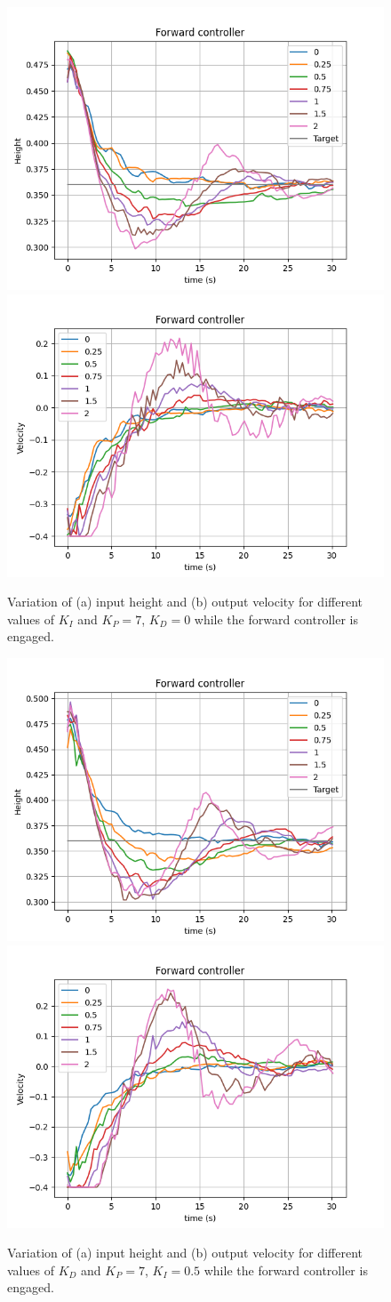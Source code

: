 \begin{figure}
  \centering
  \includegraphics[width=.45\linewidth]{img/pid/fwd/aaa_fwd_pos_p3_int_d0.png}
  \includegraphics[width=.45\linewidth]{img/pid/fwd/aaa_fwd_vel_p3_int_d0.png}
  \caption{Variation of (a) input height and (b) output velocity for different values of $K_{I}$ and $K_P=7$, $K_D=0$ while the forward controller is engaged.}\label{fig:tune-fwd-int}
\end{figure}
\begin{figure}
  \centering
  \includegraphics[width=.45\linewidth]{img/pid/fwd/aaa_fwd_pos_p3_i0_der.png}
  \includegraphics[width=.45\linewidth]{img/pid/fwd/aaa_fwd_vel_p3_i0_der.png}
  \caption{Variation of (a) input height and (b) output velocity for different values of $K_{D}$ and $K_P=7$, $K_I=0.5$ while the forward controller is engaged.}\label{fig:tune-fwd-der}
\end{figure}



